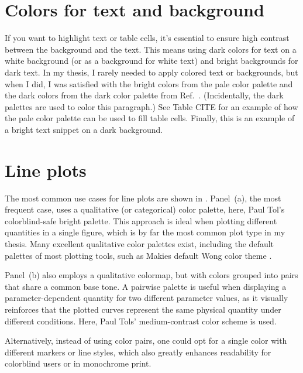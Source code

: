 \section{Colors for text and background}
{\color{dqblue} If you want to highlight text or table cells, it's essential to ensure high contrast between the background and the text.} 
{\color{dqcyan} This means using dark colors for text on a white background (or as a background for white text) and bright backgrounds for dark text.}
{\color{dqgreen} In my thesis, I rarely needed to apply colored text or backgrounds, but when I did, I was satisfied with the bright colors from the pale color palette and the dark colors from the dark color palette from Ref.~\cite{paultol}.} 
{\color{dqyellow}(Incidentally, the dark palettes are used to color this paragraph.)}
{\color{dqred} See Table CITE for an example of how the pale color palette can be used to fill table cells.}
\colorbox{dqblue}{\color{white}Finally, this} \colorbox{dqcyan}{\color{white}is an example} \colorbox{dqgreen}{\color{white}of a bright text} \colorbox{dqyellow}{\color{white}snippet on a} \colorbox{dqred}{\color{white}dark background.}

\section{Line plots}\label{sec:line_plots}

The most common use cases for line plots are shown in . 
Panel~(a), the most frequent case, uses a qualitative (or categorical) color palette, here, Paul Tol's colorblind-safe bright palette. This approach is ideal when plotting different quantities in a single figure, which is by far the most common plot type in my thesis. Many excellent qualitative color palettes exist, including the default palettes of most plotting tools, such as Makies default Wong color theme \cite{wong2011}.

Panel~(b) also employs a qualitative colormap, but with colors grouped into pairs that share a common base tone. A pairwise palette is useful when displaying a parameter-dependent quantity for two different parameter values, as it visually reinforces that the plotted curves represent the same physical quantity under different conditions. Here, Paul Tols' medium-contrast color scheme is used.

Alternatively, instead of using color pairs, one could opt for a single color with different markers or line styles, which also greatly enhances readability for colorblind users or in monochrome print. 

